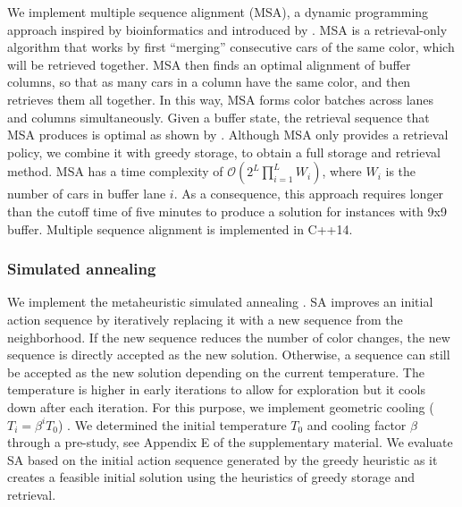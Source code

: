 \documentclass[11pt]{elsarticle}
\begin{document}
We implement multiple sequence alignment (MSA), a dynamic programming approach inspired by bioinformatics and introduced by \citet{Epping.2003}. MSA is a retrieval-only algorithm that works by first ``merging'' consecutive cars of the same color, which will be retrieved together. MSA then finds an optimal alignment of buffer columns, so that as many cars in a column have the same color, and then retrieves them all together. In this way, MSA forms color batches across lanes and columns simultaneously. Given a buffer state, the retrieval sequence that MSA produces is optimal as shown by \citet{Epping.2003}. Although MSA only provides a retrieval policy, we combine it with greedy storage, to obtain a full storage and retrieval method. MSA has a time complexity of $ \mathcal{O}\left(2^L\prod_{i=1}^L W_i\right)$, where $W_i$ is the number of cars in buffer lane $i$. As a consequence, this approach requires longer than the cutoff time of five minutes to produce a solution for instances with 9x9 buffer.
Multiple sequence alignment is implemented in C++14.

\subsubsection*{Simulated annealing}

We implement the metaheuristic simulated annealing \citep[SA, e.g.,][]{gendreau2018handbook}.
SA improves an initial action sequence by iteratively replacing it with a new sequence from the neighborhood. If the new sequence reduces the number of color changes, the new sequence is directly accepted as the new solution. Otherwise, a sequence can still be accepted as the new solution depending on the current temperature. The temperature is higher in early iterations to allow for exploration but it cools down after each iteration. For this purpose, we implement geometric cooling ($T_{i} = \beta^i T_0$) \citep{goodson2015priori,knopp2017batch}. We determined the initial temperature $T_0$ and cooling factor $\beta$ through a pre-study, see Appendix E of the supplementary material.
We evaluate SA based on the initial action sequence generated by the greedy heuristic as it creates a feasible initial solution using the heuristics of greedy storage and retrieval.
\end{document}
